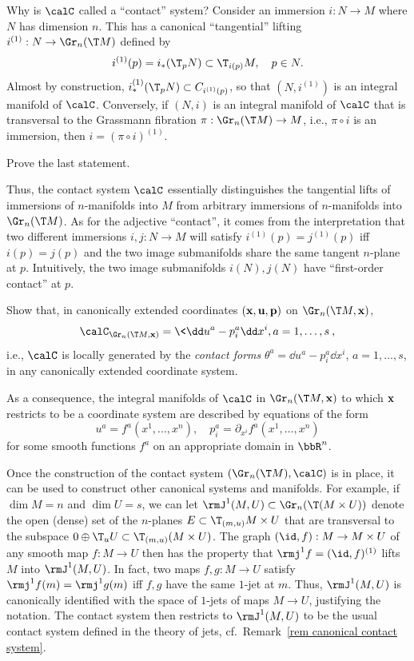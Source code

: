 Why is $\calC$ called a ``contact'' system? Consider an immersion $i:N\to M$ where $N$ has dimension $n$. This has a canonical ``tangential'' lifting $i^{(1)}:N\to \Gr_n(\T M)$ defined by 
\[i^{(1)}(p)=i_\ast(\T_p N)\subset \T_{i(p)}M,\quad p\in N.\]
Almost by construction, $i_\ast^{(1)}(\T_p N)\subset C_{i^{(1)}(p)}$, so that $(N,i^{(1)})$ is an integral manifold of $\calC$. Conversely, if $(N,i)$ is an integral manifold of $\calC$ that is transversal to the Grassmann fibration $\pi:\Gr_n(\T M)\to M$, i.e., $\pi\circ i$ is an immersion, then $i=(\pi\circ i)^{(1)}$.

\begin{xca}
    Prove the last statement.
\end{xca}

Thus, the contact system $\calC$ essentially distinguishes the tangential lifts of immersions of $n$-manifolds into $M$ from arbitrary immersions of $n$-manifolds into $\Gr_n(\T M)$. As for the adjective ``contact'', it comes from the interpretation that two different immersions $i,j:N\to M$ will satisfy $i^{(1)}(p)=j^{(1)}(p)$ iff $i(p)=j(p)$ and the two image submanifolds share the same tangent $n$-plane at $p$. Intuitively, the two image submanifolds $i(N), j(N)$ have ``first-order contact'' at $p$.

\begin{xca}
    Show that, in canonically extended coordinates $(\bf{x},\bf{u},\bf{p})$ on $\Gr_n(\T M,\bf{x})$, 
    \[\calC_{\Gr_n(\T M,\bf{x})}=\<\dd u^a-p^a_i\dd x^i,a=1,\ldots,s\>,\]
    i.e., $\calC$ is locally generated by the \emph{contact forms} $\theta^a=\dd u^a-p^a_i\dd x^i$, $a=1,\ldots,s$, in any canonically extended coordinate system.
\end{xca}

As a consequence, the integral manifolds of $\calC$ in $\Gr_n(\T M,\bf{x})$ to which $\bf{x}$ restricts to be a coordinate system are described by equations of the form 
\[u^a=f^a(x^1,\ldots,x^n),\quad p^a_i=\partial_{x^i}f^a(x^1,\ldots,x^n)\]
for some smooth functions $f^a$ on an appropriate domain in $\bbR^n$.

Once the construction of the contact system $(\Gr_n(\T M),\calC)$ is in place, it can be used to construct other canonical systems and manifolds. For example, if $\dim M=n$ and $\dim U=s$, we can let $\rmJ^1(M,U)\subset\Gr_n(\T (M\times U))$ denote the open (dense) set of the $n$-planes $E\subset\T_{(m,u)}M\times U$ that are transversal to the subspace $0\oplus \T_u U\subset\T_{(m,u)}(M\times U)$. The graph $(\id,f):M\to M\times U$ of any smooth map $f:M\to U$ then has the property that $\rmj^1 f=(\id,f)^{(1)}$ lifts $M$ into $\rmJ^1(M,U)$. In fact, two maps $f,g:M\to U$ satisfy $\rmj^1 f(m)=\rmj^1 g(m)$ iff $f,g$ have the same $1$-jet at $m$. Thus, $\rmJ^1(M,U)$ is canonically identified with the space of $1$-jets of maps $M\to U$, justifying the notation. The contact system then restricts to $\rmJ^1(M,U)$ to be the usual contact system defined in the theory of jets, cf.\ Remark~\ref{rem canonical contact system}.

